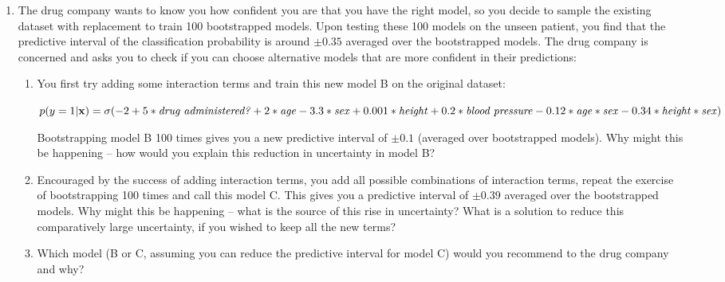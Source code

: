 \documentclass[submit]{harvardml}
\begin{document}
\begin{problem}
\begin{enumerate}
    \item The drug company wants to know you how confident you are that you have the right model, so you decide to sample the existing dataset with replacement to train 100 bootstrapped models. Upon testing these 100 models on the unseen patient, you find that the predictive interval of the classification probability is around $\pm 0.35$ averaged over the bootstrapped models. The drug company is concerned and asks you to check if you can choose alternative models that are more confident in their predictions:
    \begin{enumerate}
        \item You first try adding some interaction terms and train this new model B on the original dataset:

        $p(y=1 | \mathbf{x}) = \sigma(-2 + 5*\text{\textit{drug administered?}} + 2*\text{\textit{age}} - 3.3*\text{\textit{sex}} + 0.001*\text{\textit{height}} + 0.2*\text{\textit{blood pressure}} - 0.12*\text{\textit{age}}*\text{\textit{sex}} -0.34*\text{\textit{height}}*\text{\textit{sex}})$

        Bootstrapping model B 100 times gives you a new predictive interval of $\pm 0.1$ (averaged over bootstrapped models). Why might this be happening -- how would you explain this reduction in uncertainty in model B?

        \item Encouraged by the success of adding interaction terms, you add all possible combinations of interaction terms, repeat the exercise of bootstrapping 100 times and call this model C. This gives you a predictive interval of $\pm 0.39$ averaged over the bootstrapped models. Why might this be happening -- what is the source of this rise in uncertainty? What is a solution to reduce this comparatively large uncertainty, if you wished to keep all the new terms? 
        
        \item Which model (B or C, assuming you can reduce the predictive interval for model C) would you recommend to the drug company and why?
        
    \end{enumerate}


\end{enumerate}
\end{problem}
\end{document}
